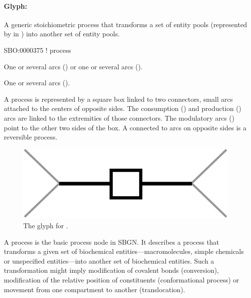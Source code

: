 

\paragraph{Glyph: }
\label{sec:process}

A generic stoichiometric process that transforms a set of entity pools (represented by  in \SBGNPDLone) into another set of entity pools.

\begin{glyphDescription}

\glyphSboTerm SBO:0000375 ! process

\glyphOrigin One or several  arcs () or one or several  arcs ().

\glyphTarget One or several  arcs ().

\glyphNode A process is represented by a square box linked to two connectors, small arcs attached to the centers of opposite sides. The consumption () and production () arcs are linked to the extremities of those connectors. The modulatory arcs () point to the other two sides of the box. A  connected to  arcs on opposite sides is a reversible process. 

\end{glyphDescription}

\begin{figure}[H]
  \centering
  \includegraphics[scale = 0.4]{images/process}
  \caption{The \PD glyph for .}
  \label{fig:process}
\end{figure}

A process is the basic process node in SBGN.  It describes a process that transforms a given set of biochemical entities---macromolecules, simple chemicals or unspecified entities---into another set of biochemical entities.  Such a transformation might imply modification of covalent bonds (conversion), modification of the relative position of constituents (conformational process) or movement from one compartment to another (translocation).

